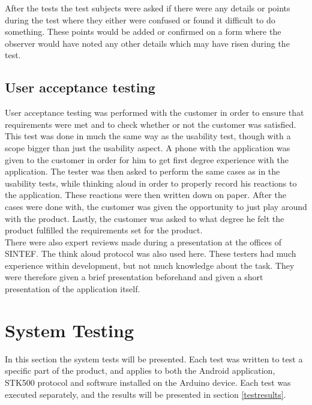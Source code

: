 			After the tests the test subjects were asked if there were any details or points during the test where they either were confused or found it difficult to do something. These points would be added or confirmed on a form where the observer would have noted any other details which may have risen during the test.

		\subsection{User acceptance testing}
		User acceptance testing was performed with the customer in order to ensure that requirements were met and to check whether or not the customer was satisfied. This test was done in much the same way as the usability test, though with a scope bigger than just the usability aspect. A phone with the application was given to the customer in order for him to get first degree experience with the application. The tester was then asked to perform the same cases as in the usability tests, while thinking aloud in order to properly record his reactions to the application. These reactions were then written down on paper. After the cases were done with, the customer was given the opportunity to just play around with the product. Lastly, the customer was asked to what degree he felt the product fulfilled the requirements set for the product.\\
		\newline
		There were also expert reviews made during a presentation at the offices of SINTEF. The think aloud protocol was also used here. These testers had much experience within development, but not much knowledge about the task. They were therefore given a brief presentation beforehand and given a short presentation of the application itself.\\


	\section{System Testing}
	\label{systemtesting}
	In this section the system tests will be presented. Each test was written to test a specific part of the product, and applies to both the Android application, STK500 protocol and software installed on the Arduino device. Each test was executed separately, and the results will be presented in section \ref{testresults}.

